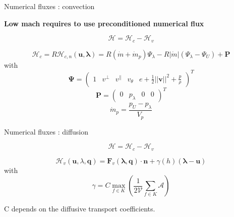 \documentclass[24pt,t,table, aspectratio=169]{beamer}
\newcommand{\vecu}{\mathbf{u}}
\newcommand{\vecF}{\mathbf{F}}
\newcommand{\vecq}{\mathbf{q}}
\newcommand{\vecP}{\mathbf{P}}
\newcommand{\vecPsi}{\boldsymbol{\Psi}}
\newcommand{\vecHcal}{\boldsymbol{\mathcal{H}}}
\newcommand{\veclambda}{\boldsymbol{\lambda}}
\begin{document}
\begin{frame}{Numerical fluxes : convection}

\textbf{Low mach requires to use preconditioned numerical flux}
\begin{framed}
\begin{equation*}
\vecHcal = \vecHcal_c - \vecHcal_v
\end{equation*}
\end{framed}

\begin{equation*}
	\vecHcal_c = R \vecHcal_{c,n}(\vecu, \veclambda) = R (\dot{m} + \dot{m}_p) \Psi_\lambda - R |\dot{m}| (\Psi_\lambda - \Psi_U) + \vecP
\end{equation*}
with
\begin{equation*}
	\vecPsi = \begin{pmatrix} 1 & v^\perp & v^\parallel & v_\theta & e + \frac{1}{2} ||\mathbf{v}||^2 + \frac{p}{\rho} \end{pmatrix}^T
\end{equation*}
\begin{equation*}
\vecP = \begin{pmatrix} 0 & p_\lambda & 0 & 0 \end{pmatrix}^T
\end{equation*}
\begin{equation*}
\dot{m}_p = \frac{p_U - p_\lambda}{V_p}
\end{equation*}


\end{frame}

\begin{frame}{Numerical fluxes : diffusion}

\begin{framed}
\begin{equation*}
\vecHcal = \vecHcal_c - \vecHcal_v
\end{equation*}
\end{framed}

\begin{equation*}
	\vecHcal_v(\vecu, \lambda, \vecq) = \vecF_v(\veclambda, \vecq) \cdot \mathbf{n} + \gamma(h) (\veclambda - \vecu)
\end{equation*}
with 
\begin{equation*}
	\gamma = C \max_{f\in K}\left(\frac{1}{2\mathcal{V}} \sum_{f\in K} \mathcal{A}\right) 
\end{equation*}

C depends on the diffusive transport coefficients.

\end{frame}
\end{document}
